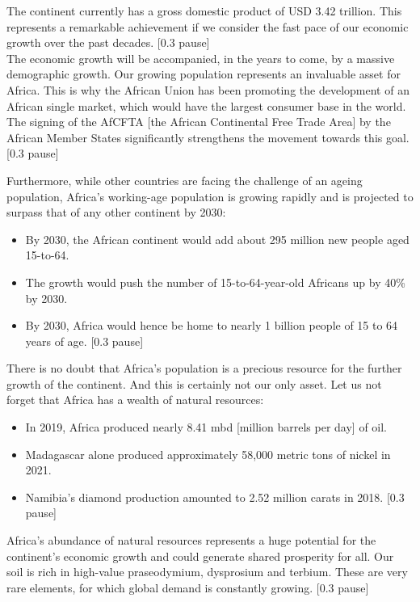 The continent currently has a gross domestic product of USD 3.42 trillion. This represents a remarkable achievement if we consider the fast pace of our economic growth over the past decades. [0.3 pause] \\

The economic growth will be accompanied, in the years to come, by a massive demographic growth. Our growing population represents an invaluable asset for Africa. This is why the African Union has been promoting the development of an African single market, which would have the largest consumer base in the world. The signing of the AfCFTA [the African Continental Free Trade Area] by the African Member States significantly strengthens the movement towards this goal. [0.3 pause] \\\largerpage

Furthermore, while other countries are facing the challenge of an ageing population, Africa’s working-age population is growing rapidly and is projected to surpass that of any other continent by 2030: 
\begin{itemize}
    \item By 2030, the African continent would add about 295 million new people aged 15-to-64. 
    \item The growth would push the number of 15-to-64-year-old Africans up by 40\% by 2030. 
    \item By 2030, Africa would hence be home to nearly 1 billion people of 15 to 64 years of age. [0.3 pause] 
\end{itemize}

There is no doubt that Africa’s population is a precious resource for the further growth of the continent. And this is certainly not our only asset. Let us not forget that Africa has a wealth of natural resources: 
\begin{itemize}
    \item In 2019, Africa produced nearly 8.41 mbd [million barrels per day] of oil. 
    \item Madagascar alone produced approximately 58,000 metric tons of nickel in 2021. 
    \item Namibia's diamond production amounted to 2.52 million carats in 2018. [0.3 pause]
\end{itemize}

Africa’s abundance of natural resources represents a huge potential for the continent’s economic growth and could generate shared prosperity for all. Our soil is rich in high-value praseodymium, dysprosium and terbium. These are very rare elements, for which global demand is constantly growing. [0.3 pause] \\

